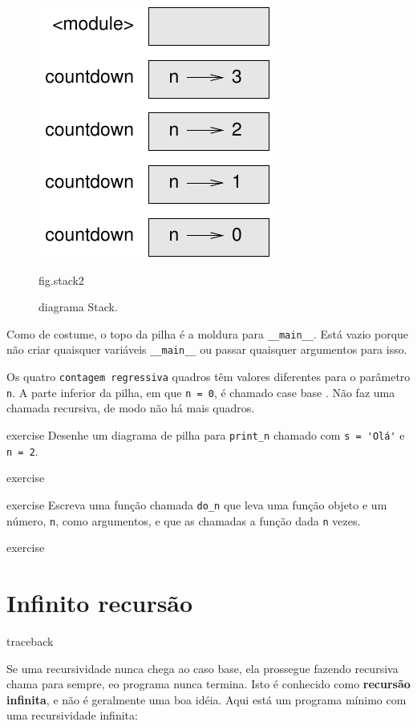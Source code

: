 \documentclass[10pt]{book}
\begin{document}
\begin{exercise}
{\begin{figure}
\centerline
{\includegraphics[scale = 0.8] {figs/stack2.pdf}}
\caption{diagrama Stack.}
\label{} fig.stack2
\end{figure}


Como de costume, o topo da pilha é a moldura para \verb "__main__".
Está vazio porque não criar quaisquer variáveis 
\Verb "__main__" ou passar quaisquer argumentos para isso.

Os quatro {\tt contagem regressiva} quadros têm valores diferentes para o
parâmetro {\tt n}. A parte inferior da pilha, em que {\tt n = 0}, é
chamado {case base \bf}. Não faz uma chamada recursiva, de modo
não há mais quadros.

\begin{} exercise
Desenhe um diagrama de pilha para \verb "print_n" chamado com
\verb "s = 'Olá'" e {\tt n = 2}.
\end{} exercise

\begin{} exercise
Escreva uma função chamada \verb "do_n" que leva uma função
objeto e um número, {\tt n}, como argumentos, e que as chamadas
a função dada {\tt n} vezes.
\end{} exercise



\section{Infinito recursão}
\index{} traceback

Se uma recursividade nunca chega ao caso base, ela prossegue fazendo
recursiva chama para sempre, eo programa nunca termina. Isto é
conhecido como {\bf recursão infinita}, e não é geralmente
uma boa idéia. Aqui está um programa mínimo com uma recursividade infinita:

}
\end{exercise}
\end{document}
